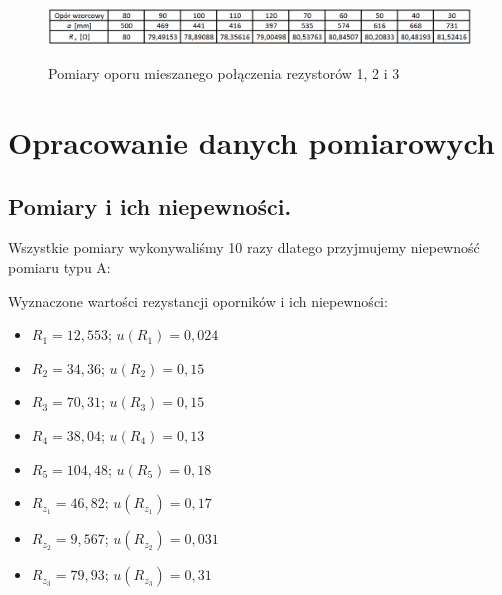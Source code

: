 \documentclass [a4paper,11pt]{article}
\begin{document}
	\begin{figure}[!h]
		\centering
		\begin{center}
		\caption{Pomiary oporu mieszanego połączenia rezystorów 1, 2 i 3}
		\includegraphics[width=\textwidth]{(R1zR2)+R3}
		\label{fig:(r1zr2)+r3}
		\end{center}
	\end{figure}
		
	

	\renewcommand*{\figurename}{Wykres} 
	\setcounter{figure}{0}
	\newpage
	\section{Opracowanie danych pomiarowych}\label{sec:opr}
	\subsection{Pomiary i ich niepewności.}
		
		Wszystkie pomiary wykonywaliśmy 10 razy dlatego przyjmujemy niepewność pomiaru typu A:
		
		Wyznaczone wartości rezystancji oporników i ich niepewności:
		\begin{itemize}
			\item $R_1=12,553$; $u(R_1)=0,024$
			\item $R_2=34,36$; $u(R_2)=0,15$
			\item $R_3=70,31$; $u(R_3)=0,15$
			\item $R_4=38,04$; $u(R_4)=0,13$
			\item $R_5=104,48$; $u(R_5)=0,18$
			\item $R_{z_1}=46,82$; $u(R_{z_1})=0,17$
			\item $R_{z_2}=9,567$; $u(R_{z_2})=0,031$
			\item $R_{z_3}=79,93$; $u(R_{z_3})=0,31$
		\end{itemize}	
 
	
\end{document}
